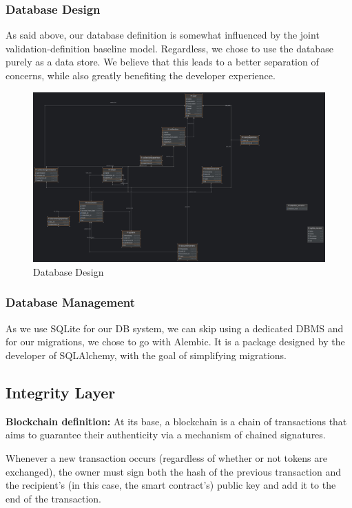 \documentclass[a4paper,11pt]{article}
\begin{document}
            \subsubsection{Database Design}
                \quad As said above, our database definition is somewhat influenced by the joint validation-definition baseline model. Regardless, we chose to use the database purely as a data store. We believe that this leads to a better separation of concerns, while also greatly benefiting the developer experience.
                
            \begin{figure}[htbp]
                \centering
                \includegraphics[width=\linewidth]{images/Database Design.jpg}
                \caption{Database Design}
            \end{figure}
            \subsubsection{Database Management}
                \quad As we use SQLite for our DB system, we can skip using a dedicated DBMS and for our migrations, we chose to go with Alembic. It is a package designed by the developer of SQLAlchemy, with the goal of simplifying migrations.
        
        \subsection{Integrity Layer}
            \quad \textbf{Blockchain definition:} At its base, a blockchain is a chain of transactions that aims to guarantee their authenticity via a mechanism of chained signatures.
                
            \quad Whenever a new transaction occurs (regardless of whether or not tokens are exchanged), the owner must sign both the hash of the previous transaction and the recipient's (in this case, the smart contract's) public key and add it to the end of the transaction. \cite{bitcoin}
                
\end{document}
